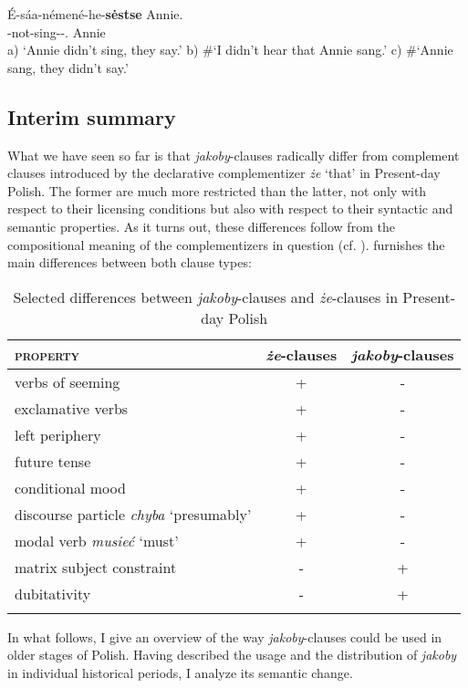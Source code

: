 \documentclass[output=paper
,modfonts
,nonflat]{langsci/langscibook}
\begin{document}
\ea \gll	 	É-sáa-némené-he-\textbf{sėstse} Annie. \label{cheyenne} \\
		{\thirdperson}-not-sing-{\negation}\textsubscript{{\an}}-{\rep}.{\thirdperson}{\sg}  Annie \\
	\glt	a) `Annie didn't sing, they say.' 
	\glt	b)  \#`I didn't hear that Annie sang.' 
	\glt	c)  \#`Annie sang, they didn't say.' 
\z		
\subsection{Interim summary}

What we have seen so far is that \emph{jakoby}-clauses radically differ from complement clauses introduced by the declarative complementizer \emph{że} `that' in Present-day Polish. The former are much more restricted than the latter, not only with respect to their licensing conditions but also with respect to their syntactic and semantic properties. As it turns out, these differences follow from the compositional meaning of the complementizers in question (cf. \cite{Moulton2009}).  furnishes the main differences between both clause types: 

\begin{table}[h] 
\begin{tabular}{lcc} 
\lsptoprule
 \textsc{property} & \emph{że}-clauses & \emph{jakoby}-clauses \\
\midrule
verbs of seeming & + & - \\
exclamative verbs & + & - \\
left periphery & + & - \\
future tense & + & - \\
conditional mood & + & - \\
discourse particle \emph{chyba} `presumably' & + & - \\
modal verb \emph{musieć} `must' & + & - \\
matrix subject constraint & - & + \\
dubitativity & - & + \\  
\lspbottomrule
\end{tabular}
\caption{Selected differences between \emph{jakoby}-clauses and \emph{że}-clauses in Present-day Polish} \label{differences}
\end{table}

\noindent In what follows, I give an overview of the way \emph{jakoby}-clauses could be used in older stages of Polish. Having described the usage and the distribution of \emph{jakoby} in individual historical periods, I analyze its semantic change.  
\end{document}
